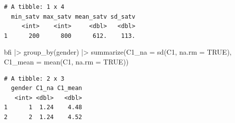 \documentclass[
  letterpaper,
  DIV=11,
  numbers=noendperiod]{scrreprt}
\newenvironment{Shaded}{\begin{snugshade}}{\end{snugshade}}
\newcommand{\AttributeTok}[1]{\textcolor[rgb]{0.40,0.45,0.13}{#1}}
\newcommand{\ConstantTok}[1]{\textcolor[rgb]{0.56,0.35,0.01}{#1}}
\newcommand{\FunctionTok}[1]{\textcolor[rgb]{0.28,0.35,0.67}{#1}}
\newcommand{\NormalTok}[1]{\textcolor[rgb]{0.00,0.23,0.31}{#1}}
\newcommand{\SpecialCharTok}[1]{\textcolor[rgb]{0.37,0.37,0.37}{#1}}
\begin{document}
\begin{verbatim}
# A tibble: 1 x 4
  min_satv max_satv mean_satv sd_satv
     <int>    <int>     <dbl>   <dbl>
1      200      800      612.    113.
\end{verbatim}

\begin{Shaded}
\begin{Highlighting}[]
\NormalTok{bfi }\SpecialCharTok{|\textgreater{}} \FunctionTok{group\_by}\NormalTok{(gender) }\SpecialCharTok{|\textgreater{}} 
  \FunctionTok{summarize}\NormalTok{(}\AttributeTok{C1\_na =} \FunctionTok{sd}\NormalTok{(C1, }\AttributeTok{na.rm =} \ConstantTok{TRUE}\NormalTok{),}
            \AttributeTok{C1\_mean =} \FunctionTok{mean}\NormalTok{(C1, }\AttributeTok{na.rm =} \ConstantTok{TRUE}\NormalTok{))}
\end{Highlighting}
\end{Shaded}

\begin{verbatim}
# A tibble: 2 x 3
  gender C1_na C1_mean
   <int> <dbl>   <dbl>
1      1  1.24    4.48
2      2  1.24    4.52
\end{verbatim}
\end{document}
